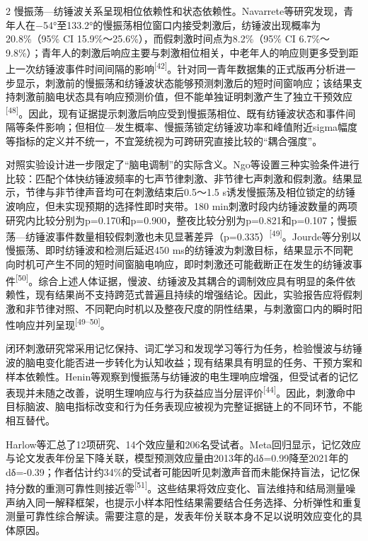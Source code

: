 \documentclass[UTF8,zihao=5,fontset=none]{ctexart}
\newcommand{\hei}{\CJKfamily{hei}}
\newcommand{\leveltwo}[1]{%
  \par\noindent{\hei\fontsize{10.5pt}{12.6pt}\selectfont\mdseries #1\par}}
\newcommand{\refcite}[1]{\nolinebreak[4]\textsuperscript{[#1]}}
\begin{document}
\begin{multicols}{2}
慢振荡—纺锤波关系呈现相位依赖性和状态依赖性。Navarrete等研究发现，青年人在−54°至133.2°的慢振荡相位窗口内接受刺激后，纺锤波出现概率为20.8\%（95\% CI 15.9\%～25.6\%），而假刺激时间点为8.2\%（95\% CI 6.7\%～9.8\%）；青年人的刺激后响应主要与刺激相位相关，中老年人的响应则更多受到距上一次纺锤波事件时间间隔的影响\refcite{42}。针对同一青年数据集的正式版再分析进一步显示，刺激前的慢振荡和纺锤波状态能够预测刺激后的短时间窗响应；该结果支持刺激前脑电状态具有响应预测价值，但不能单独证明刺激产生了独立干预效应\refcite{48}。因此，现有证据提示刺激后响应受到慢振荡相位、既有纺锤波状态和事件间隔等条件影响；但相位—发生概率、慢振荡锁定纺锤波功率和峰值附近sigma幅度等指标的定义并不统一，不宜笼统视为可跨研究直接比较的“耦合强度”。\par

对照实验设计进一步限定了“脑电调制”的实际含义。Ngo等设置三种实验条件进行比较：匹配个体快纺锤波频率的七声节律刺激、非节律七声刺激和假刺激。结果显示，节律与非节律声音均可在刺激结束后0.5～1.5 s诱发慢振荡及相位锁定的纺锤波响应，但未实现预期的选择性即时夹带。180 min刺激时段内纺锤波数量的两项研究内比较分别为p=0.170和p=0.900，整夜比较分别为p=0.821和p=0.107；慢振荡—纺锤波事件数量相较假刺激也未见显著差异（p=0.335）\refcite{49}。Jourde等分别以慢振荡、即时纺锤波和检测后延迟450 ms的纺锤波为刺激目标，结果显示不同靶向时机可产生不同的短时间窗脑电响应，即时刺激还可能截断正在发生的纺锤波事件\refcite{50}。综合上述人体证据，慢波、纺锤波及其耦合的调制效应具有明显的条件依赖性，现有结果尚不支持跨范式普遍且持续的增强结论。因此，实验报告应将假刺激和非节律对照、不同靶向时机以及整夜尺度的阴性结果，与刺激窗口内的瞬时阳性响应并列呈现\refcite{49--50}。\par

\leveltwo{3.3 记忆巩固与认知收益的疗效证据及争议}

闭环刺激研究常采用记忆保持、词汇学习和发现学习等行为任务，检验慢波与纺锤波的脑电变化能否进一步转化为认知收益；现有结果具有明显的任务、干预方案和样本依赖性。Henin等观察到慢振荡与纺锤波的电生理响应增强，但受试者的记忆表现并未随之改善，说明生理响应与行为获益应当分层评价\refcite{44}。因此，刺激命中目标脑波、脑电指标改变和行为任务表现应被视为完整证据链上的不同环节，不能相互替代。\par

Harlow等汇总了12项研究、14个效应量和206名受试者。Meta回归显示，记忆效应与论文发表年份呈下降关联，模型预测效应量由2013年的dδ=0.99降至2021年的dδ=-0.39；作者估计约34\%的受试者可能因听见刺激声音而未能保持盲法，记忆保持分数的重测可靠性则接近零\refcite{51}。这些结果将效应变化、盲法维持和结局测量噪声纳入同一解释框架，也提示小样本阳性结果需要结合任务选择、分析弹性和重复测量可靠性综合解读。需要注意的是，发表年份关联本身不足以说明效应变化的具体原因。\par


\end{multicols}
\end{document}
